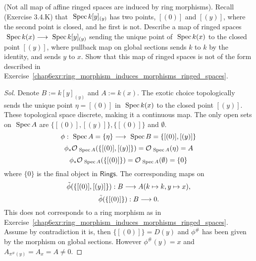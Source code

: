 \documentclass[11pt]{book} %
\begin{document}
\begin{exr} (Not all map of affine ringed spaces are induced by ring morphisms).
Recall (Exercise 3.4.K) that $\text{ Spec\,} k[y]_{(y)}$ has two points, $[(0)]$ and $[(y)]$, where the second point is closed, and he first is not. Describe a map of ringed spaces $\text{ Spec\,} k(x)\longrightarrow \text{ Spec\,} k[y]_{(y)}$ sending the unique point of $\text{ Spec\,} k(x)$ to the closed point $[(y)]$, where pullback map on global sections sends $k$ to $k$ by the identity, and sends $y$ to $x$. Show that this map of ringed spaces is not of the form described in  Exercise~\ref{chap6exr:ring_morphism_induces_morphisms_ringed_spaces}.
\end{exr}
\begin{proof}[Sol]
Denote $B:=k[y]_{(y)}$ and $A:=k(x)$.
The exotic choice  topologically sends the unique point $\eta=[(0)]$ in $\text{ Spec\,} k(x)$ to the closed point $[(y)]$. These topological space discrete, making it a continuous map.  The only open sets on $\text{ Spec\,} A$ are $\{[(0)],[(y)]\},\{[(0)]\}$ and $\emptyset$.
$$
\phi:\text{ Spec\,} A=\{\eta\}\longrightarrow \text{ Spec\,} B=\{[(0)],[(y)]\}
$$
$$
\phi_*{\cal O}_{\text{ Spec\,} A}(\{[(0)],[(y)]\})={\cal O}_{\text{ Spec\,} A}(\eta)=A
$$
$$
\phi_*{\cal O}_{\text{ Spec\,} A}(\{[(0)]\})={\cal O}_{\text{ Spec\,} A}(\emptyset)=\{0\}
$$
where $\{0\}$ is the final object in $\mathsf{Rings}$. The corresponding maps on
$$
\tilde{\phi}(\{[(0)],[(y)]\}):B\longrightarrow A (k\mapsto k, y\mapsto x),
$$
$$
\tilde{\phi}(\{[(0)]\}):B\longrightarrow 0 .
$$
This does not corresponds to a ring morphism as in Exercise~\ref{chap6exr:ring_morphism_induces_morphisms_ringed_spaces}. Assume by contradiction it is, then $\{[(0)]\}=D(y)$ and $\phi^\#$ has been given by the morphism on global sections. However $\phi^\#(y)=x$ and $A_{\pi^\#(y)}=A_x=A\neq 0$.
\end{proof}
\end{document}
